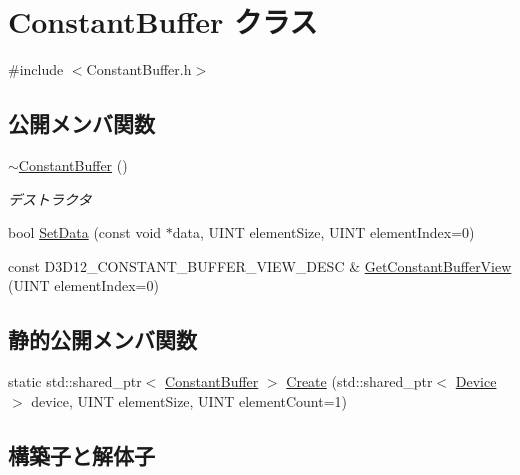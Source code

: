 \hypertarget{class_constant_buffer}{}\section{Constant\+Buffer クラス}
\label{class_constant_buffer}


{\ttfamily \#include $<$Constant\+Buffer.\+h$>$}

\subsection*{公開メンバ関数}
\begin{DoxyCompactItemize}
\item 
\mbox{\hyperlink{class_constant_buffer_aef84d67313575f7aa41745e2fe198067}{$\sim$\+Constant\+Buffer}} ()
\begin{DoxyCompactList}\small\item\em デストラクタ \end{DoxyCompactList}\item 
bool \mbox{\hyperlink{class_constant_buffer_a9debafccb5dad5e7a79402448024ba1d}{Set\+Data}} (const void $\ast$data, U\+I\+NT element\+Size, U\+I\+NT element\+Index=0)
\item 
const D3\+D12\+\_\+\+C\+O\+N\+S\+T\+A\+N\+T\+\_\+\+B\+U\+F\+F\+E\+R\+\_\+\+V\+I\+E\+W\+\_\+\+D\+E\+SC \& \mbox{\hyperlink{class_constant_buffer_ae601501c3200a0bad0907d20811dde9e}{Get\+Constant\+Buffer\+View}} (U\+I\+NT element\+Index=0)
\end{DoxyCompactItemize}
\subsection*{静的公開メンバ関数}
\begin{DoxyCompactItemize}
\item 
static std\+::shared\+\_\+ptr$<$ \mbox{\hyperlink{class_constant_buffer}{Constant\+Buffer}} $>$ \mbox{\hyperlink{class_constant_buffer_a00a3476e6f88e7d2526a3305a3b2856c}{Create}} (std\+::shared\+\_\+ptr$<$ \mbox{\hyperlink{class_device}{Device}} $>$ device, U\+I\+NT element\+Size, U\+I\+NT element\+Count=1)
\end{DoxyCompactItemize}


\subsection{構築子と解体子}
\mbox{\label{class_constant_buffer_aef84d67313575f7aa41745e2fe198067}} 
